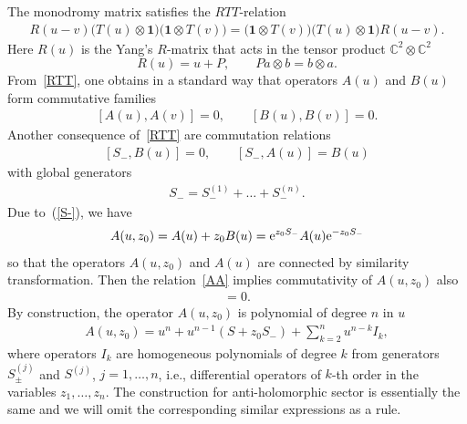\documentclass[10pt,a4paper]{amsart}
\numberwithin{equation}{section}
\begin{document}
The monodromy matrix satisfies the $RTT$-relation~\cite{F,KSk,Skl91}
\begin{align}\label{RTT}
R(u-v) \bigl(T(u)\otimes \bm{1}\bigr) \bigl(\bm{1} \otimes T(v)\bigr)
= \bigl(\bm{1} \otimes T(v)\bigr) \bigl(T(u)\otimes \bm{1}\bigr) R(u-v).
\end{align}
Here $R(u)$ is the Yang's $R$-matrix that acts in the tensor product $\mathbb{C}^2\otimes \mathbb{C}^2$
\begin{equation*}
	R(u) = u + P, \qquad P a \otimes b = b \otimes a.
\end{equation*}
From~\eqref{RTT}, one obtains in a standard way that operators $A(u)$ and $B(u)$
form commutative families
\begin{align}\label{AA}
[A(u), A(v)]=0, \qquad [B(u), B(v)]=0.
\end{align}
%
Another consequence of~\eqref{RTT} are commutation relations
\begin{align}\label{S-}
[S_- , B(u)] = 0 ,\qquad [S_- , A(u)] = B(u)
\end{align}
with global generators
\begin{align*}
S_- = S^{(1)}_-+\dots+S^{(n)}_-.
\end{align*}
Due to~(\ref{S-}), we have
\begin{align}\label{Az0B}
A(u,z_0) = A(u)+z_0 B(u) = {\rm e}^{z_0 S_{-}} A(u) {\rm e}^{-z_0 S_{-}}
\end{align}
so that the operators $A(u,z_0)$ and $A(u)$ are connected
by similarity transformation.
Then the relation~\eqref{AA} implies commutativity of
$A(u,z_0)$ also
\begin{align*}
[A(u,z_0) ,A(v,z_0)] = 0.
\end{align*}
By construction, the operator $A(u,z_0)$ is polynomial of degree $n$ in $u$
\begin{align}\label{ABCDexp}
A(u,z_0)=u^n+u^{n-1} \left(S+z_{0} S_{-}\right) +\sum_{k=2}^{n} u^{n-k} I_k ,
\end{align}
where operators $I_k$ are homogeneous polynomials of degree $k$
from generators $S^{(j)}_{\pm}$ and $S^{(j)}$, $j=1,\dots,n$, i.e., differential operators of $k$-th order in the variables $z_1,\dots,z_n$.
The construction for anti-holomorphic
sector is essentially the same and we will omit the corresponding similar expressions as a rule.
\end{document}
